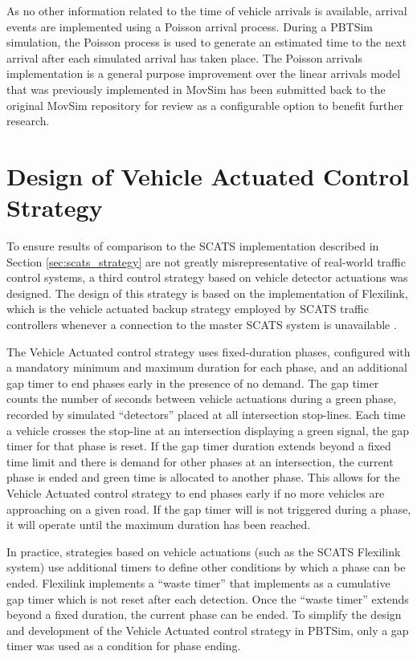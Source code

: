 As no other information related to the time of vehicle arrivals is available, arrival events are implemented using a Poisson arrival process. During a PBTSim simulation, the Poisson process is used to generate an estimated time to the next arrival after each simulated arrival has taken place. The Poisson arrivals implementation is a general purpose improvement over the linear arrivals model that was previously implemented in MovSim has been submitted back to the original MovSim repository for review as a configurable option to benefit further research.

\section{Design of Vehicle Actuated Control Strategy}

To ensure results of comparison to the SCATS implementation described in Section \ref{sec:scats_strategy} are not greatly misrepresentative of real-world traffic control systems, a third control strategy based on vehicle detector actuations was designed. The design of this strategy is based on the implementation of Flexilink, which is the vehicle actuated backup strategy employed by SCATS traffic controllers whenever a connection to the master SCATS system is unavailable \cite{scatstraining}.

The Vehicle Actuated control strategy uses fixed-duration phases, configured with a mandatory minimum and maximum duration for each phase, and an additional gap timer to end phases early in the presence of no demand. The gap timer counts the number of seconds between vehicle actuations during a green phase, recorded by simulated ``detectors'' placed at all intersection stop-lines. Each time a vehicle crosses the stop-line at an intersection displaying a green signal, the gap timer for that phase is reset. If the gap timer duration extends beyond a fixed time limit and there is demand for other phases at an intersection, the current phase is ended and green time is allocated to another phase. This allows for the Vehicle Actuated control strategy to end phases early if no more vehicles are approaching on a given road. If the gap timer will is not triggered during a phase, it will operate until the maximum duration has been reached.

In practice, strategies based on vehicle actuations (such as the SCATS Flexilink system) use additional timers to define other conditions by which a phase can be ended. Flexilink implements a ``waste timer'' that implements as a cumulative gap timer which is not reset after each detection. Once the ``waste timer'' extends beyond a fixed duration, the current phase can be ended. To simplify the design and development of the Vehicle Actuated control strategy in PBTSim, only a gap timer was used as a condition for phase ending.  


